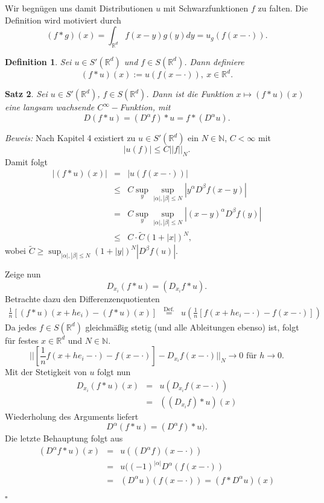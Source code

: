 \documentclass[12pt,a4paper,titlepage]{scrartcl}
\newtheorem{Satz}{Satz}[subsection]
\newtheorem{Definition}[Satz]{Definition}
\numberwithin{equation}{section}
\newcommand{\R}{\mathbb{R}} %
\newcommand{\N}{\mathbb{N}} %
\newcommand{\m}{\cdot}
\newcommand{\Bew}{\emph{Beweis: }}
\newcommand{\qed}{\begin{flushright}
		$\square$
	\end{flushright}}
\begin{document}
	Wir begnügen uns damit Distributionen $u$ mit Schwarzfunktionen $f$ zu falten. Die Definition wird motiviert durch
	$$(f*g)(x)=\int_{\R^d}f(x-y)g(y) dy = u_g(f(x-\m)).$$
	
	\begin{Definition}
		Sei $u\in S'(\R^d)$ und $f\in S(\R^d)$. Dann definiere
		$$(f*u)(x):= u(f(x-\m)),~ x\in \R^d.$$
	\end{Definition}
	
	\begin{Satz}
		Sei $u\in S'(\R^d)$, $f\in S(\R^d)$. Dann ist die Funktion $x\mapsto (f*u)(x)$ eine langsam wachsende $C^\infty-$Funktion, mit 
		$$D(f*u) = (D^\alpha f)*u = f*(D^\alpha u).$$
	\end{Satz}
	
	\Bew Nach Kapitel 4 existiert zu $u\in S'(\R^d)$ ein $N\in \N$, $C<\infty$ mit 
	$$|u(f)|\leq C||f||_N.$$
	Damit folgt
	\begin{eqnarray}
		|(f*u)(x)| &=& |u(f(x-\m))|\nonumber\\
		&\leq& C\sup_y \sup_{|\alpha|,|\beta|\leq N}|y^\alpha D^\beta f(x-y)|\nonumber\\
		&=& C\sup_y\sup_{|\alpha|,|\beta|\leq N} |(x-y)^\alpha D^\beta f(y)|\nonumber\\
		&\leq& C\m \tilde{C}(1+|x|)^N, \nonumber
	\end{eqnarray}
	wobei $\tilde{C}\geq \sup_{|\alpha|,|\beta|\leq N}(1+|y|)^N|D^\beta f(u)|$.
	
	Zeige nun
	$$D_{x_i}(f*u) = (D_{x_i}f*u).$$
	Betrachte dazu den Differenzenquotienten
	\begin{eqnarray}
		\frac{1}{n}[(f*u)(x+h e_i)-(f*u)(x)] &\overset{\text{Def.}}{=}& u(\frac{1}{n}[f(x+he_i -\m)-f(x-\m)])\nonumber
	\end{eqnarray}
	Da jedes $f\in S(\R^d)$ gleichmäßig stetig (und alle Ableitungen ebenso) ist, folgt für festes $x\in \R^d$ und $N\in \N$.
	$$||[\frac{1}{n}f(x+he_i-\m)-f(x-\m)]-D_{x_i}f(x-\m)||_N\rightarrow 0\text{ für } h\rightarrow 0.$$
	Mit der Stetigkeit von $u$ folgt nun
	\begin{eqnarray}
		D_{x_i}(f*u)(x) &=& u(D_{x_i}f(x-\m))\nonumber\\
		&=& ((D_{x_i}f)*u)(x)\nonumber
	\end{eqnarray}
	Wiederholung des Arguments liefert
	$$D^\alpha (f*u) = (D^\alpha f)*u).$$
	Die letzte Behauptung folgt aus 
	\begin{eqnarray}
		(D^\alpha f*u)(x) &=& u((D^\alpha f)(x-\m))\nonumber\\
		&=& u((-1)^{|\alpha|}D^\alpha (f(x-\m))\nonumber\\
		&=& (D^\alpha u)(f(x-\m)) = (f*D^\alpha u)(x)\nonumber
	\end{eqnarray}
	\qed
	
\end{document}
